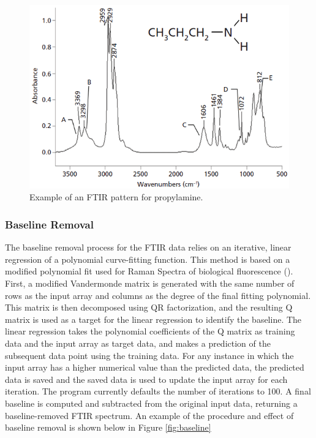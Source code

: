 \documentclass{dhbenelux}
\begin{document}
\begin{figure}[!h]
    \centering
    \includegraphics[scale=0.5]{spectroscopy_ex.png}
    \caption{Example of an FTIR pattern for propylamine. \cite{spectroscopy_ex}}
    \label{fig:FTIR_ex}
\end{figure}

\subsubsection{Baseline Removal}

The baseline removal process for the FTIR data relies on an iterative, linear regression of a polynomial curve-fitting function. This method is based on a modified polynomial fit used for Raman Spectra of biological fluorescence (\cite{baseline_removal}). First, a modified Vandermonde matrix is generated with the same number of rows as the input array and columns as the degree of the final fitting polynomial. This matrix is then decomposed using QR factorization, and the resulting Q matrix is used as a target for the linear regression to identify the baseline. The linear regression takes the polynomial coefficients of the Q matrix as training data and the input array as target data, and makes a prediction of the subsequent data point using the training data. For any instance in which the input array has a higher numerical value than the predicted data, the predicted data is saved and the saved data is used to update the input array for each iteration. The program currently defaults the number of iterations to 100. A final baseline is computed and subtracted from the original input data, returning a baseline-removed FTIR spectrum. An example of the procedure and effect of baseline removal is shown below in Figure \ref{fig:baseline}
\end{document}
